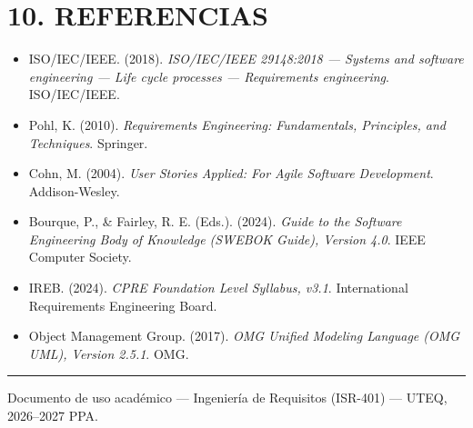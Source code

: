 \documentclass[11pt]{article}
\begin{document}
\section*{\textcolor{utegreendk}{10. REFERENCIAS}}

\begin{itemize}[leftmargin=18pt,itemsep=2pt]
  \item ISO/IEC/IEEE. (2018). \textit{ISO/IEC/IEEE 29148:2018 --- Systems and software engineering --- Life cycle processes --- Requirements engineering}. ISO/IEC/IEEE.
  \item Pohl, K. (2010). \textit{Requirements Engineering: Fundamentals, Principles, and Techniques}. Springer.
  \item Cohn, M. (2004). \textit{User Stories Applied: For Agile Software Development}. Addison-Wesley.
  \item Bourque, P., \& Fairley, R. E. (Eds.). (2024). \textit{Guide to the Software Engineering Body of Knowledge (SWEBOK Guide), Version 4.0}. IEEE Computer Society.
  \item IREB. (2024). \textit{CPRE Foundation Level Syllabus, v3.1}. International Requirements Engineering Board.
  \item Object Management Group. (2017). \textit{OMG Unified Modeling Language (OMG UML), Version 2.5.1}. OMG.
\end{itemize}

\vspace{10pt}
\noindent\textcolor{gold}{\rule{\linewidth}{1.5pt}}
\begin{center}
\footnotesize Documento de uso académico --- Ingeniería de Requisitos (ISR-401) --- UTEQ, 2026--2027 PPA.
\end{center}
\end{document}
